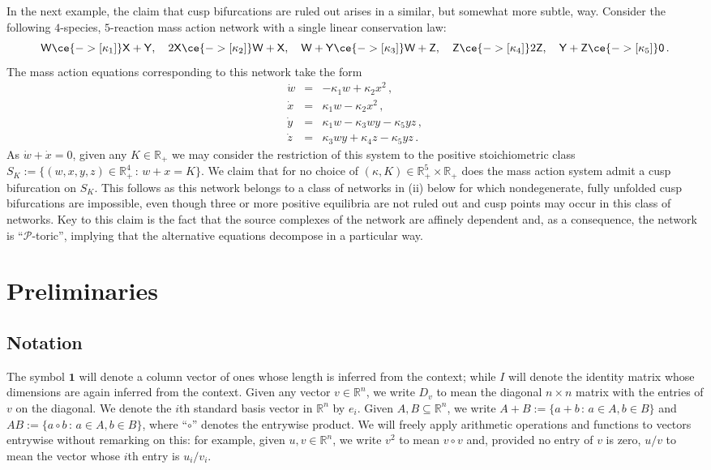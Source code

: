 \documentclass[11pt]{amsart}
\renewcommand{\k}{\kappa}
\newcommand{\R}{\mathbb{R}}
\newcommand{\fW}{\mathsf{W}}
\newcommand{\fX}{\mathsf{X}}
\newcommand{\fY}{\mathsf{Y}}
\newcommand{\fZ}{\mathsf{Z}}
\newcommand{\mP}{\mathcal{P}}
\theoremstyle{definition}
\newenvironment{ex}
  {\pushQED{\qed}\renewcommand{\qedsymbol}{$\Diamond$}\example}
  {\popQED\endexample}
\begin{document}
In the next example, the claim that cusp bifurcations are ruled out arises in a similar, but somewhat more subtle, way.
\begin{ex} Consider the following $4$-species, $5$-reaction mass action network with a single linear conservation law:
\[
\fW \ce{->[\k_1]} \fX + \fY,\quad 2\fX \ce{->[\k_2]} \fW+\fX,\quad \fW+\fY \ce{->[\k_3]} \fW + \fZ,\quad \fZ \ce{->[\k_4]} 2\fZ,\quad \fY + \fZ \ce{->[\k_5]} \mathsf{0}\,.
\]
The mass action equations corresponding to this network take the form
\[
\begin{array}{rcl}
\dot w &=& -\k_1w+\k_2x^2\,,\\
\dot x &=& \k_1w-\k_2 x^2\,,\\
\dot y &=&\k_1 w - \k_3wy - \k_5 yz\,,\\
\dot z &=& \k_3 wy + \k_4 z - \k_5 yz\,.
\end{array}
\]
As $\dot w + \dot x = 0$, given any $K \in \R_+$ we may consider the restriction of this system to the positive stoichiometric class $S_K:=\{(w,x,y,z) \in \R^4_+\,:\,w + x = K\}$. We claim that for no choice of $(\k,K)\in \R^5_+ \times \R_+$ does the mass action system admit a cusp bifurcation on $S_K$. This follows as this network belongs to a class of networks in (ii) below for which nondegenerate, fully unfolded cusp bifurcations are impossible, even though three or more positive equilibria are not ruled out and cusp points may occur in this class of networks. Key to this claim is the fact that the source complexes of the network are affinely dependent and, as a consequence, the network is ``$\mP$-toric'', implying that the alternative equations decompose in a particular way. 
\end{ex}

\section{Preliminaries}
\label{secprelim}

\subsection{Notation}

The symbol $\bm{1}$ will denote a column vector of ones whose length is inferred from the context; while $I$ will denote the identity matrix whose dimensions are again inferred from the context. Given any vector $v \in \R^n$, we write $D_v$ to mean the diagonal $n \times n$ matrix with the entries of $v$ on the diagonal. We denote the $i$th standard basis vector in $\R^n$ by $e_i$. Given $A, B \subseteq \R^n$, we write $A+B := \{a+b\,:\, a \in A, b\in B\}$ and $AB :=\{a\circ b\,:\,a \in A, b \in B\}$, where ``$\circ$'' denotes the entrywise product. We will freely apply arithmetic operations and functions to vectors entrywise without remarking on this: for example, given $u, v \in \R^n$, we write $v^2$ to mean $v \circ v$ and, provided no entry of $v$ is zero, $u/v$ to mean the vector whose $i$th entry is $u_i/v_i$.
\end{document}

